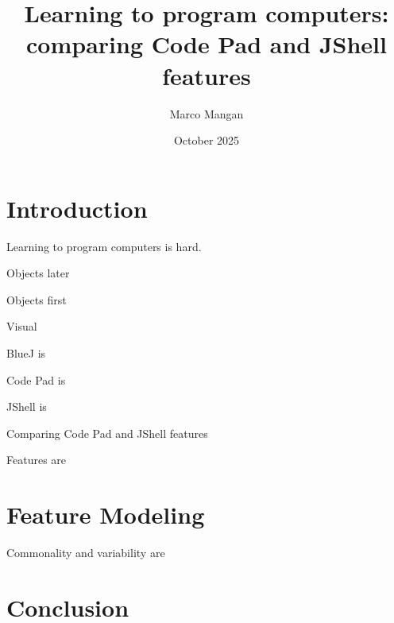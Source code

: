 \documentclass{article}
\title{Learning to program computers: comparing Code Pad and JShell features}
\author{Marco Mangan}
\date{October 2025}
\begin{document}
\maketitle

\section{Introduction}

Learning to program computers is hard. 

Objects later

Objects first

Visual

BlueJ is

Code Pad is

JShell is

Comparing Code Pad and JShell features

Features are


\section{Feature Modeling}
Commonality and variability are


\section{Conclusion}
\end{document}
